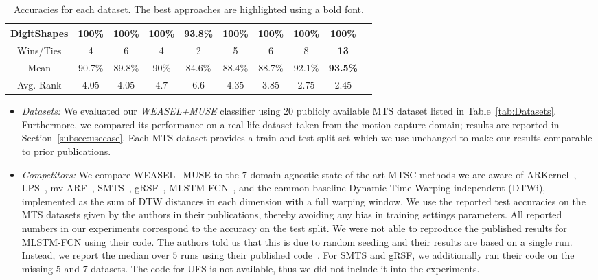 \documentclass[sigconf]{acmart}
\begin{document}
\begin{table*}[t]
\begin{centering}
\begin{tabular*}{2\columnwidth}{@{\extracolsep{\fill}}cccccccccc}
			\hline 
			DigitShapes & \textbf{100\%} & \textbf{100\%} & \textbf{100\%} & \textbf{93.8\%} & \textbf{100\%} & \textbf{100\%} & \textbf{100\%} & \textbf{100\%}\tabularnewline
			\hline
			\hline 
			Wins/Ties & 4 & 6 & 4 & 2 & 5 & 6 & 8 & \textbf{13}\tabularnewline
			\hline 
			Mean & 90.7\% & 89.8\% & 90\% & 84.6\% & 88.4\% & 88.7\% & 92.1\% & \textbf{93.5\%}\tabularnewline
			\hline 
			Avg. Rank & $4.05$ & $4.05$ & $4.7$ & $6.6$ & $4.35$ & $3.85$ & $2.75$ & $2.45$ \tabularnewline 
		\end{tabular*}
		\par\end{centering}	
	\caption{Accuracies for each dataset. The best approaches are highlighted using a bold font.\label{tab:accuracies}}
\end{table*}

\begin{itemize}
	\item \emph{Datasets:} We evaluated our \emph{WEASEL+MUSE} classifier using 20 publicly available MTS dataset listed in Table~\ref{tab:Datasets}. Furthermore, we compared its performance on a real-life dataset taken from the motion capture domain; results are reported in Section~\ref{subsec:usecase}. Each MTS dataset provides a train and test split set which we use unchanged to make our results comparable to prior publications. 
	\item \emph{Competitors:} We compare WEASEL+MUSE to the $7$ domain agnostic state-of-the-art MTSC methods we are aware of ARKernel~\cite{cuturi2011autoregressive}, LPS~\cite{baydogan2016time}, mv-ARF~\cite{tuncel2018autoregressive}, SMTS~\cite{baydogan2015learning}, gRSF~\cite{karlsson2016generalized}, MLSTM-FCN~\cite{karim2018multivariate}, and the common baseline Dynamic Time Warping independent (DTWi), implemented as the sum of DTW distances in each dimension with a full warping window. We use the reported test accuracies on the MTS datasets given by the authors in their publications, thereby avoiding any bias in training settings parameters. All reported numbers in our experiments correspond to the accuracy on the test split. 
	We were not able to reproduce the published results for MLSTM-FCN using their code. The authors told us that this is due to random seeding and their results are based on a single run. Instead, we report the median over $5$ runs using their published code~\cite{karim2018multivariate}.	
	For SMTS and gRSF, we additionally ran their code on the missing $5$ and $7$ datasets. The code for UFS is not available, thus we did not include it into the experiments.

\end{itemize}
\end{document}
